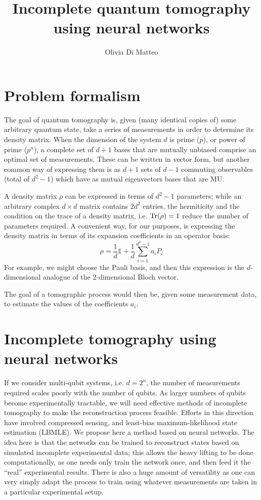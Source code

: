 \documentclass[a4paper,10pt]{article}
\title{Incomplete quantum tomography using neural networks}
\author{Olivia Di Matteo}
\begin{document}
\maketitle

\section{Problem formalism}

The goal of quantum tomography is, given (many identical copies of) some arbitrary quantum state, take a series of measurements in order to determine its density matrix. When the dimension of the system $d$ is prime ($p$), or power of prime ($p^n$), a complete set of $d + 1$ bases that are mutually unbiased comprise an optimal set of measurements. These can be written in vector form, but another common way of expressing them is as $d + 1$ sets of $d - 1$ commuting observables (total of $d^2-1$) which have as mutual eigenvectors bases that are MU.

A density matrix $\rho$ can be expressed in terms of $d^2 - 1$ parameters; while an arbitrary complex $d \times d$ matrix contains $2d^2$ entries, the hermiticity and the condition on the trace of a density matrix, i.e. $\hbox{Tr}(\rho) = 1$ reduce the number of parameters required. A convenient way, for our purposes, is expressing the density matrix in terms of its expansion coefficients in an operator basis:
\begin{equation}
 \rho = \frac{1}{d} \mathds{1} + \frac{1}{d} \sum_{i = 1}^{d^2 - 1} a_i P_i
\end{equation}
\noindent For example, we might choose the Pauli basis, and then this expression is the $d$-dimensional analogue of the 2-dimensional Bloch vector.

The goal of a tomographic process would then be, given some measurement data, to estimate the values of the coefficients $a_i$.

\section{Incomplete tomography using neural networks}

If we consider multi-qubit systems, i.e. $d = 2^n$, the number of measurements required scales poorly with the number of qubits. As larger numbers of qubits become experimentally tractable, we will need effective methods of incomplete tomography to make the reconstruction process feasible. Efforts in this direction have involved compressed sensing, and least-bias maximum-likelihood state estimation (LBMLE). We propose here a method based on neural networks. The idea here is that the networks can be trained to reconstruct states based on simulated incomplete experimental data; this allows the heavy lifting to be done computationally, as one needs only train the network once, and then feed it the ``real'' experimental results. There is also a huge amount of versatility as one can very simply adapt the process to train using whatever measurements are taken in a particular experimental setup.
\end{document}
